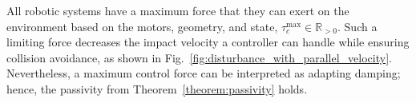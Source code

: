 \iflong
All robotic systems have a maximum force that they can exert on the environment based on the motors, geometry, and state, $\tau_c^{\mathrm{max}} \in \mathbb{R}_{>0}$. Such a limiting force decreases the impact velocity a controller can handle while ensuring collision avoidance, as shown in Fig.~\ref{fig:disturbance_with_parallel_velocity}. Nevertheless, a maximum control force can be interpreted as adapting damping; hence, the passivity from Theorem~\ref{theorem:passivity} holds.
\fi

